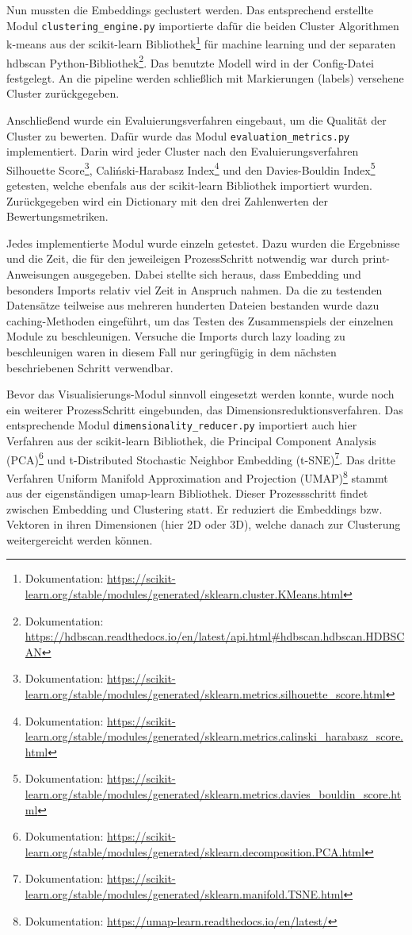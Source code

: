 Nun mussten die Embeddings geclustert werden. Das entsprechend erstellte Modul \texttt{clustering\_engine.py} importierte dafür die beiden Cluster Algorithmen k-means aus der scikit-learn Bibliothek\footnote{Dokumentation: \url{https://scikit-learn.org/stable/modules/generated/sklearn.cluster.KMeans.html}} für machine learning und der separaten hdbscan Python-Bibliothek\footnote{Dokumentation: \url{https://hdbscan.readthedocs.io/en/latest/api.html\#hdbscan.hdbscan.HDBSCAN}}. Das benutzte Modell wird in der Config-Datei festgelegt. An die pipeline werden schließlich mit Markierungen (labels) versehene Cluster zurückgegeben.

Anschließend wurde ein Evaluierungsverfahren eingebaut, um die Qualität der Cluster zu bewerten. Dafür wurde das Modul \texttt{evaluation\_metrics.py} implementiert. Darin wird jeder Cluster nach den Evaluierungsverfahren Silhouette Score\footnote{Dokumentation: \url{https://scikit-learn.org/stable/modules/generated/sklearn.metrics.silhouette_score.html}}, Caliński-Harabasz Index\footnote{Dokumentation: \url{https://scikit-learn.org/stable/modules/generated/sklearn.metrics.calinski_harabasz_score.html}} und den Davies-Bouldin Index\footnote{Dokumentation: \url{https://scikit-learn.org/stable/modules/generated/sklearn.metrics.davies_bouldin_score.html}} getesten, welche ebenfals aus der scikit-learn Bibliothek importiert wurden. Zurückgegeben wird ein Dictionary mit den drei Zahlenwerten der Bewertungsmetriken.

Jedes implementierte Modul wurde einzeln getestet. Dazu wurden die Ergebnisse und die Zeit, die für den jeweileigen ProzessSchritt notwendig war durch print-Anweisungen ausgegeben. Dabei stellte sich heraus, dass Embedding und besonders Imports relativ viel Zeit in Anspruch nahmen. Da die zu testenden Datensätze teilweise aus mehreren hunderten Dateien bestanden wurde dazu caching-Methoden eingeführt, um das Testen des Zusammenspiels der einzelnen Module zu beschleunigen. Versuche die Imports durch lazy loading zu beschleunigen waren in diesem Fall nur geringfügig in dem nächsten beschriebenen Schritt verwendbar.

Bevor das Visualisierungs-Modul sinnvoll eingesetzt werden konnte, wurde noch ein weiterer ProzessSchritt eingebunden, das Dimensionsreduktionsverfahren. Das entsprechende Modul \texttt{dimensionality\_reducer.py} importiert auch hier Verfahren aus der scikit-learn Bibliothek, die Principal Component Analysis (PCA)\footnote{Dokumentation: \url{https://scikit-learn.org/stable/modules/generated/sklearn.decomposition.PCA.html}} und t-Distributed Stochastic Neighbor Embedding (t-SNE)\footnote{Dokumentation: \url{https://scikit-learn.org/stable/modules/generated/sklearn.manifold.TSNE.html}}. Das dritte Verfahren Uniform Manifold Approximation and Projection (UMAP)\footnote{Dokumentation: \url{https://umap-learn.readthedocs.io/en/latest/}} stammt aus der eigenständigen umap-learn Bibliothek. Dieser Prozessschritt findet zwischen Embedding und Clustering statt. Er reduziert die Embeddings bzw. Vektoren in ihren Dimensionen (hier 2D oder 3D), welche danach zur Clusterung weitergereicht werden können.

